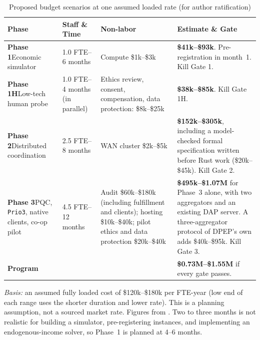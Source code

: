 \documentclass[10pt,twoside,openany]{book}
\theoremstyle{dpepstyle}
\begin{document}
\begin{table}[htbp]
\centering
\caption{Proposed budget scenarios at one assumed loaded rate (for author ratification)}
\label{tab:exec-budget}
\footnotesize
\setlength{\tabcolsep}{4.5pt}
\begin{tabular}{L{1.10in} L{0.86in} L{1.05in} L{1.42in}}
\toprule
\textbf{Phase} & \textbf{Staff \& Time} & \textbf{Non-labor} & \textbf{Estimate \& Gate} \\
\midrule
\textbf{Phase 1}\newline Economic simulator & 1.0 FTE--6 months & Compute \$1k--\$3k & \textbf{\$41k--\$93k}. Pre-registration in month~1. Kill Gate 1. \\
\addlinespace[3pt]
\textbf{Phase 1H}\newline Low-tech human probe & 1.0 FTE--4 months (in parallel) & Ethics review, consent, compensation, data protection: \$8k--\$25k & \textbf{\$38k--\$85k}. Kill Gate 1H. \\
\addlinespace[3pt]
\textbf{Phase 2}\newline Distributed coordination & 2.5 FTE--8 months & WAN cluster \$2k--\$5k & \textbf{\$152k--\$305k}, including a model-checked formal specification written before Rust work (\$20k--\$45k). Kill Gate 2. \\
\addlinespace[3pt]
\textbf{Phase 3}\newline PQC, \texttt{Prio3}, native clients, co-op pilot & 4.5 FTE--12 months & Audit \$60k--\$180k (including fulfillment and clients); hosting \$10k--\$40k; pilot ethics and data protection \$20k--\$40k & \textbf{\$495k--\$1.07M} for Phase~3 alone, with two aggregators and an existing DAP server. A three-aggregator protocol of DPEP's own adds \$40k--\$95k. Kill Gate 3. \\
\midrule
\textbf{Program} & & & \textbf{\$0.73M--\$1.55M} if every gate passes. \\
\bottomrule
\end{tabular}
\par\smallskip
{\scriptsize\raggedright \emph{Basis:} an assumed fully loaded cost of \$120k--\$180k per FTE-year (low end of each range uses the shorter duration and lower rate). This is a planning assumption, not a sourced market rate. Figures from . Two to three months is not realistic for building a simulator, pre-registering instances, and implementing an endogenous-income solver, so Phase~1 is planned at 4--6 months.\par}
\end{table}
\end{document}
